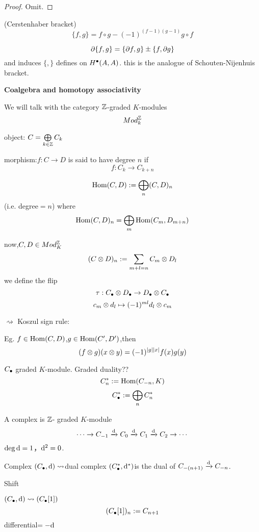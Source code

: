 \begin{proof}
Omit.
\end{proof}


\begin{definition}(Cerstenhaber bracket)
$$\{f,g\}=f\circ g-(-1)^{(f-1)(g-1)}g\circ f$$
\end{definition}

\begin{prop}
$$\partial\{f,g\}=\{\partial f,g\}\pm\{f,\partial g\}$$
and induces
$\{,\}$ defines on $H^{\bullet}(A,A)$.
this is  the analogue of Schouten-Nijenhuis bracket.
\end{prop}


\textbf{Coalgebra and homotopy associativity}

We will talk with the category
$\mathbb{Z}$-graded $K$-modules
$$Mod_k^{\mathbb{Z}}$$

object: $C=\bigoplus\limits_{k\in\mathbb{Z}}C_k$

morphism:$f:C\to D$ is said to have degree $n$ if
$$f:C_k\to C_{k+n}$$

$$\operatorname{Hom}(C,D):=\bigoplus_n(C,D)_n$$
(i.e. degree$=n$)
where
$$\operatorname{Hom}(C,D)_n=\bigoplus_m\operatorname{Hom}(C_m,D_{m+n})$$

now,$C,D\in Mod_{K}^{\mathbb{Z}}$
$$(C\otimes D)_n:=\sum_{m+l=n}C_m\otimes D_l$$
we define the flip
$$\tau:C_{\bullet}\otimes D_{\bullet}\to D_{\bullet}\otimes C_{\bullet}$$
$$c_m\otimes d_l\mapsto(-1)^{ml}d_l\otimes c_m$$

$\rightsquigarrow$ Koszul sign rule:

Eg. $f\in\operatorname{Hom}(C,D)$,$g\in\operatorname{Hom}(C',D')$,then
$$(f\otimes g)(x\otimes y)=(-1)^{|g||x|}f(x)g(y)$$

$C_{\bullet}$ graded $K$-module. Graded duality??
$$C^*_n:=\operatorname{Hom}(C_{-n},K)$$
$$C^*_{\bullet}:=\bigoplus_n C_n^*$$

A complex is $\mathbb{Z}$- graded $K$-module
$$\cdots\to C_{-1}\xrightarrow{\mathrm{d}}C_0\xrightarrow{\mathrm{d}}C_1\xrightarrow{\mathrm{d}}C_2\to\cdots$$
$\deg\mathrm{d}=1$，$\mathrm{d}^2=0$.

Complex $(C_{\bullet},\mathrm{d})\rightsquigarrow$dual complex
$(C_{\bullet}^*,\mathrm{d}^*)$is the dual of
$C_{-(n+1)}\xrightarrow{\mathrm{d}}C_{-n}$.

Shift

$(C_{\bullet},\mathrm{d})\rightsquigarrow(C_{\bullet}[1])$
$$(C_{\bullet}[1])_n:=C_{n+1}$$
differential$=-\mathrm{d}$

